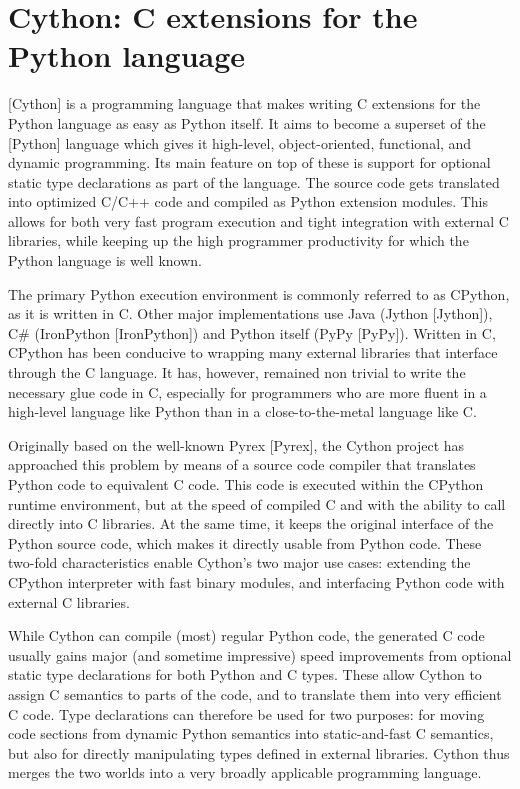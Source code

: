 \newpage
\section{Cython: C extensions for the Python language}

[Cython] is a programming language that makes writing C extensions for the Python language as easy as Python itself. It aims to become a superset of the [Python] language which gives it high-level, object-oriented, functional, and dynamic programming. Its main feature on top of these is support for optional static type declarations as part of the language. The source code gets translated into optimized C/C++ code and compiled as Python extension modules. This allows for both very fast program execution and tight integration with external C libraries, while keeping up the high programmer productivity for which the Python language is well known.

The primary Python execution environment is commonly referred to as CPython, as it is written in C. Other major implementations use Java (Jython [Jython]), C\# (IronPython [IronPython]) and Python itself (PyPy [PyPy]). Written in C, CPython has been conducive to wrapping many external libraries that interface through the C language. It has, however, remained non trivial to write the necessary glue code in C, especially for programmers who are more fluent in a high-level language like Python than in a close-to-the-metal language like C.

Originally based on the well-known Pyrex [Pyrex], the Cython project has approached this problem by means of a source code compiler that translates Python code to equivalent C code. This code is executed within the CPython runtime environment, but at the speed of compiled C and with the ability to call directly into C libraries. At the same time, it keeps the original interface of the Python source code, which makes it directly usable from Python code. These two-fold characteristics enable Cython’s two major use cases: extending the CPython interpreter with fast binary modules, and interfacing Python code with external C libraries.

While Cython can compile (most) regular Python code, the generated C code usually gains major (and sometime impressive) speed improvements from optional static type declarations for both Python and C types. These allow Cython to assign C semantics to parts of the code, and to translate them into very efficient C code. Type declarations can therefore be used for two purposes: for moving code sections from dynamic Python semantics into static-and-fast C semantics, but also for directly manipulating types defined in external libraries. Cython thus merges the two worlds into a very broadly applicable programming language.




